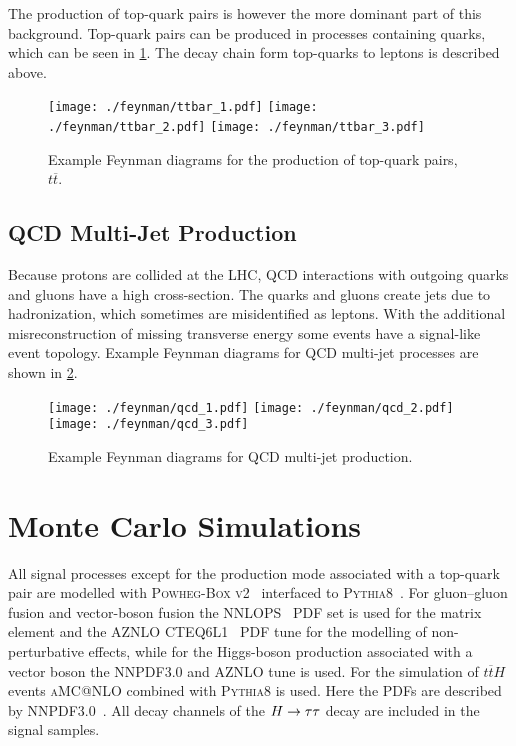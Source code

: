 The production of top-quark pairs is however the more dominant part of this background.
Top-quark pairs can be produced in processes containing quarks, which can be seen in \cref{fig:processes:ttbar}.
The decay chain form top-quarks to leptons is described above.

\begin{figure}[htb]
    \centering
    \texttt{[image: ./feynman/ttbar\_1.pdf]}
    \texttt{[image: ./feynman/ttbar\_2.pdf]}
    \texttt{[image: ./feynman/ttbar\_3.pdf]}
    \caption{Example Feynman diagrams for the production of top-quark pairs, $t\overline{t}$.}\label{fig:processes:ttbar}
\end{figure}

\subsection{QCD Multi-Jet Production}\label{sub:processes:qcd}

Because protons are collided at the LHC, QCD interactions with outgoing quarks and gluons have a high cross-section.
The quarks and gluons create jets due to hadronization, which sometimes are misidentified as leptons.
With the additional misreconstruction of missing transverse energy some events have a signal-like event topology.
Example Feynman diagrams for QCD multi-jet processes are shown in \cref{fig:processes:qcd}.

\begin{figure}[htb]
    \centering
    \texttt{[image: ./feynman/qcd\_1.pdf]}
    \texttt{[image: ./feynman/qcd\_2.pdf]}
    \texttt{[image: ./feynman/qcd\_3.pdf]}
    \caption{Example Feynman diagrams for QCD multi-jet production.}\label{fig:processes:qcd}
\end{figure}

\section{Monte Carlo Simulations}\label{sec:processes:mc}

All signal processes except for the production mode associated with a top-quark pair are modelled with
\textsc{Powheg-Box v2}~\cite{PowhegBox2} interfaced to \textsc{Pythia8}~\cite{Pythia8}.
For gluon--gluon fusion and vector-boson fusion the \textsc{NNLOPS}~\cite{NNLOPS} PDF set is used for the matrix element and the \textsc{AZNLO CTEQ6L1}~\cite{CTEQ6} PDF tune for the
modelling of non-perturbative effects, while for the Higgs-boson production associated with a vector boson the
\textsc{NNPDF3.0} and \textsc{AZNLO} tune is used.
For the simulation of $t\overline{t}H$ events \textsc{aMC@NLO} combined with \textsc{Pythia8} is used.
Here the PDFs are described by \textsc{NNPDF3.0}~\cite{NNPDF30}.
All decay channels of the $H \to \tau \tau$ decay are included in the signal samples.

